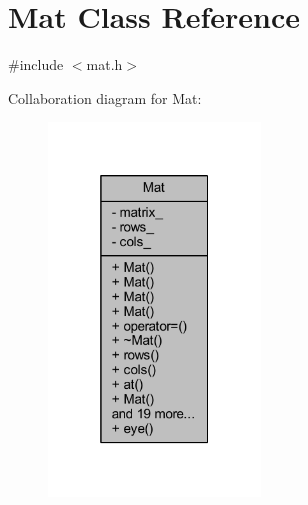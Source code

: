 \hypertarget{class_mat}{}\section{Mat Class Reference}
\label{class_mat}


{\ttfamily \#include $<$mat.\+h$>$}



Collaboration diagram for Mat\+:
\nopagebreak
\begin{figure}[H]
\begin{center}
\leavevmode
\includegraphics[width=160pt]{class_mat__coll__graph}
\end{center}
\end{figure}
